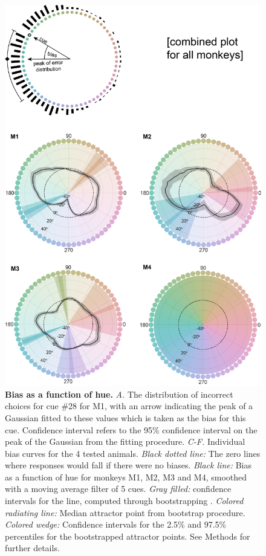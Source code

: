 \begin{figure}
\begin{center}
\includegraphics[height=\textwidth]{../../Figures/F3_BiasCurves_v2.png}
\end{center}
\caption{\textbf{Bias as a function of hue.} 
\emph{A.} The distribution of incorrect choices for cue \#28 for M1, with an arrow indicating the peak of a Gaussian fitted to these values which is taken as the bias for this cue. Confidence interval refers to the 95\% confidence interval on the peak of the Gaussian from the fitting procedure.
\emph{C-F.} Individual bias curves for the 4 tested animals.
\emph{Black dotted line:} The zero lines where responses would fall if there were no biases.
\emph{Black line:} Bias as a function of hue for monkeys M1, M2, M3 and M4, smoothed with a moving average filter of 5 cues. 
\emph{Gray filled:} confidence intervals for the line, computed through bootstrapping . 
\emph{Colored radiating line:} Median attractor point from bootstrap procedure.
\emph{Colored wedge:} Confidence intervals for the 2.5\% and 97.5\% percentiles for the bootstrapped attractor points.
See Methods for further details.} %
\label{fig:BiasCurves}
\end{figure}



